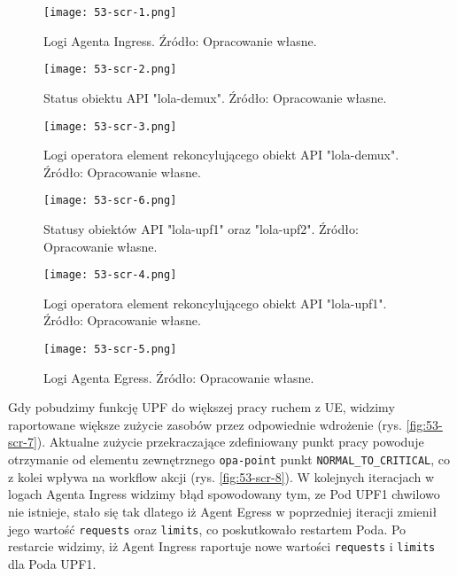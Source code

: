 \begin{figure}[!h]
    \centering \texttt{[image: 53-scr-1.png]}
    \caption{Logi Agenta Ingress. Źródło: Opracowanie własne.}\label{fig:53-scr-1}
\end{figure}

\begin{figure}[!h]
    \centering \texttt{[image: 53-scr-2.png]}
    \caption{Status obiektu API "lola-demux". Źródło: Opracowanie własne.}\label{fig:53-scr-2}
\end{figure}

\begin{figure}[!h]
    \centering \texttt{[image: 53-scr-3.png]}
    \caption{Logi operatora element rekoncylującego obiekt API "lola-demux". Źródło: Opracowanie własne.}\label{fig:53-scr-3}
\end{figure}

\begin{figure}[!h]
    \centering \texttt{[image: 53-scr-6.png]}
    \caption{Statusy obiektów API "lola-upf1" oraz "lola-upf2". Źródło: Opracowanie własne.}\label{fig:53-scr-6}
\end{figure}

\begin{figure}[!h]
    \centering \texttt{[image: 53-scr-4.png]}
    \caption{Logi operatora element rekoncylującego obiekt API "lola-upf1". Źródło: Opracowanie własne.}\label{fig:53-scr-4}
\end{figure}

\begin{figure}[!h]
    \centering \texttt{[image: 53-scr-5.png]}
    \caption{Logi Agenta Egress. Źródło: Opracowanie własne.}\label{fig:53-scr-5}
\end{figure}

Gdy pobudzimy funkcję UPF do większej pracy ruchem z UE, widzimy raportowane większe zużycie zasobów przez odpowiednie wdrożenie (rys. \ref{fig:53-scr-7}). Aktualne zużycie przekraczające zdefiniowany punkt pracy powoduje otrzymanie od elementu zewnętrznego \texttt{opa-point} punkt \texttt{NORMAL\_TO\_CRITICAL}, co z kolei wpływa na workflow akcji (rys. \ref{fig:53-scr-8}). W kolejnych iteracjach w logach Agenta Ingress widzimy błąd spowodowany tym, ze Pod UPF1 chwilowo nie istnieje, stało się tak dlatego iż Agent Egress w poprzedniej iteracji zmienił jego wartość \texttt{requests} oraz \texttt{limits}, co poskutkowało restartem Poda. Po restarcie widzimy, iż Agent Ingress raportuje nowe wartości \texttt{requests} i \texttt{limits} dla Poda UPF1.


